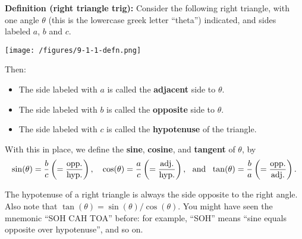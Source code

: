 \documentclass{ximera}
\begin{document}
\begin{callout}
  {\bf Definition (right triangle trig):} Consider the following right triangle, with one angle $\theta$ (this is the lowercase greek letter ``theta'') indicated, and sides labeled $a$, $b$ and $c$.

\begin{center}
  \texttt{[image: /figures/9-1-1-defn.png]}
\end{center}
  
  Then:
  \begin{itemize}
  \item   The side labeled with $a$ is called the {\bf adjacent} side to $\theta$.
  \item The side labeled with $b$ is called the {\bf opposite} side to $\theta$.
  \item   The side labeled with $c$ is called the {\bf hypotenuse} of the triangle.
  \end{itemize}
  With this in place, we define the {\bf sine}, {\bf cosine}, and {\bf tangent} of $\theta$, by $$\sin(\theta) = \frac{b}{c} \left(= \frac{\rm opp.}{\rm hyp.}\right), \quad \cos(\theta) = \frac{a}{c}\left(=\frac{\rm adj.}{\rm hyp.}\right), ~~\mbox{and}~~ \tan(\theta) = \frac{b}{a} \left(= \frac{\rm opp.}{\rm adj.}\right).$$
\end{callout}

\begin{remark}
  The hypotenuse of a right triangle is always the side opposite to the right angle. Also note that $\tan(\theta) = \sin(\theta)/\cos(\theta)$. You might have seen the mnemonic ``SOH CAH TOA'' before: for example, ``SOH'' means ``sine equals opposite over hypotenuse'', and so on.
\end{remark}
\end{document}
